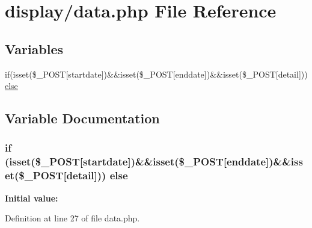 \hypertarget{data_8php}{}\section{display/data.php File Reference}
\label{data_8php}
\subsection*{Variables}
\begin{DoxyCompactItemize}
\item 
if(isset(\$\+\_\+\+P\+O\+ST\mbox{[}\textquotesingle{}startdate\textquotesingle{}\mbox{]})\&\&isset(\$\+\_\+\+P\+O\+ST\mbox{[}\textquotesingle{}enddate\textquotesingle{}\mbox{]})\&\&isset(\$\+\_\+\+P\+O\+ST\mbox{[}\textquotesingle{}detail\textquotesingle{}\mbox{]})) \hyperlink{data_8php_abf07f7a0ecea6c60a3228d81fa34bfea}{else}
\end{DoxyCompactItemize}


\subsection{Variable Documentation}
\subsubsection[{\texorpdfstring{else}{else}}]{\setlength{\rightskip}{0pt plus 5cm}if (isset(\$\+\_\+\+P\+O\+ST\mbox{[}\textquotesingle{}startdate\textquotesingle{}\mbox{]})\&\&isset(\$\+\_\+\+P\+O\+ST\mbox{[}\textquotesingle{}enddate\textquotesingle{}\mbox{]})\&\&isset(\$\+\_\+\+P\+O\+ST\mbox{[}\textquotesingle{}detail\textquotesingle{}\mbox{]})) else}\hypertarget{data_8php_abf07f7a0ecea6c60a3228d81fa34bfea}{}\label{data_8php_abf07f7a0ecea6c60a3228d81fa34bfea}
{\bfseries Initial value\+:}


Definition at line 27 of file data.\+php.

